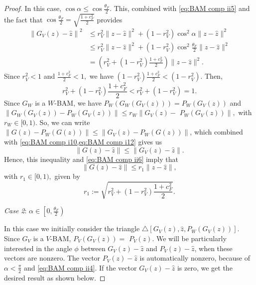 \documentclass[smallextended,numbook,nospthms]{svjour3}
\theoremstyle{plain}
\theoremstyle{definition}
\begin{document}
\begin{proof}
	
	In this case, $\cos \alpha \leq \cos \frac{\theta_{F}}{2}$. This, combined with \cref{eq:BAM comp ii5} and the fact that $\cos \frac{\theta_{F}}{2}=\sqrt{\frac{1+c_{F}^{2}}{2}}$ provides
	\begin{align}
		\left\|G_{V}(z)-\hat{z}\right\|^{2} & \leq r_{V}^{2}\|z-\hat{z}\|^{2}+\left(1-r_{V}^{2}\right) \cos ^{2} \alpha\|z-\hat{z}\|^{2} \\
		& \leq r_{V}^{2}\|z-\hat{z}\|^{2}+\left(1-r_{V}^{2}\right) \cos ^{2} \frac{\theta_{F}}{2}\|z-\hat{z}\|^{2} \\
		&=\left(r_{V}^{2}+\left(1-r_{V}^{2}\right) \frac{1+c_{F}^{2}}{2}\right)\|z-\hat{z}\|^{2}. \label{eq:BAM comp ii6}
	\end{align}
	Since $r_{V}^{2}<1$ and $\frac{1+c_{F}^{2}}{2}<1,$ we have $\left(1-r_{V}^{2}\right) \frac{1+c_{F}^{2}}{2}<\left(1-r_{V}^{2}\right)$. Then,
	\begin{equation}
		r_{V}^{2}+\left(1-r_{V}^{2}\right) \frac{1+c_{F}^{2}}{2}<r_{V}^{2}+\left(1-r_{V}^{2}\right)=1. \label{eq:BAM comp ii7}
	\end{equation}
	Since $G_{W}$ is a $W$-BAM, we have $P_{W}\left(G_{W}\left(G_{V}(z)\right)\right)=P_{W}\left(G_{V}(z)\right)$ and $\left\|G_{W}\left(G_{V}(z)\right)-P_{W}\left(G_{V}(z)\right)\right\| \leq r_{W} \| G_{V}(z)-$
	$P_{W}\left(G_{V}(z)\right) \|,$ with $r_{W} \in[0,1)$. So, we can write $\left\|G(z)-P_{W}(G(z))\right\| \leq\left\|G_{V}(z)-P_{W}(G(z))\right\|$, which combined with \cref{eq:BAM comp i10,eq:BAM comp i12}
	gives us
	\begin{equation}
		\|G(z)-\hat{z}\| \leq\left\|G_{V}(z)-\hat{z}\right\| \label{eq:BAM comp ii8}.
	\end{equation}
	Hence, this inequality and \cref{eq:BAM comp ii6} imply that
	\begin{equation}
	\|G(z)-\hat{z}\| \leq r_{1}\|z-\hat{z}\|, \label{eq:BAM comp ii9}
	\end{equation}
	with $r_{1} \in[0,1),$ given by
	\begin{equation}
	r_{1}:=\sqrt{r_{V}^{2}+\left(1-r_{V}^{2}\right) \frac{1+c_{F}^{2}}{2}}. \label{eq:BAM comp ii10}
	\end{equation}

	\emph{Case 2}: $\alpha \in\left[0, \frac{\theta_{F}}{2}\right)$
	
	In this case we initially consider the triangle $\triangle[G_{V}(z), \hat{z},P_{W}\left(G_{V}(z)\right)]$. Since $G_{V}$ is a $V$-BAM, $P_{V}\left(G_{V}(z)\right)=$ $P_{V}(z)$. We will be particularly interested in the angle $\phi$ between $G_{V}(z)-\hat{z}$ and $P_{V}(z)-\hat{z}$, when these vectors are nonzero. The vector $P_{V}(z)-\hat{z}$ is automatically nonzero, because of $\alpha<\frac{\pi}{2}$ and \cref{eq:BAM comp ii4}. If the vector $G_{V}(z)-\hat{z}$ is zero, we get the desired result as shown below.
	

\end{proof}
\end{document}
